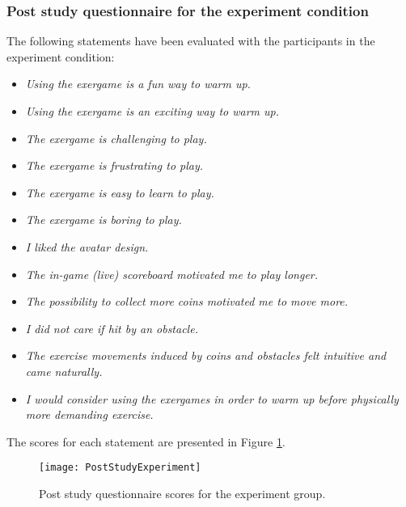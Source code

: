 \subsubsection{Post study questionnaire for the experiment condition} 
The following statements have been evaluated with the participants in the experiment condition:
\begin{itemize}
 \item \textit{Using the exergame is a fun way to warm up.}
 \item \textit{Using the exergame is an exciting way to warm up.}
 \item \textit{The exergame is challenging to play.}
 \item \textit{The exergame is frustrating to play.}
 \item \textit{The exergame is easy to learn to play.}
 \item \textit{The exergame is boring to play.}
 \item \textit{I liked the avatar design.}
 \item \textit{The in-game (live) scoreboard motivated me to play longer.}
 \item \textit{The possibility to collect more coins motivated me to move more.}
 \item \textit{I did not care if hit by an obstacle.}
 \item \textit{The exercise movements induced by coins and obstacles felt intuitive and came naturally.} 
 \item \textit{I would consider using the exergames in order to warm up before physically more demanding exercise.}
\end{itemize}
The scores for each statement are presented in Figure \ref{fig:poststudyexperiment}.\\
\begin{figure}[h]
    \centering
    \texttt{[image: PostStudyExperiment]}
    \caption{Post study questionnaire scores for the experiment group.}
    \label{fig:poststudyexperiment}
\end{figure}\\
